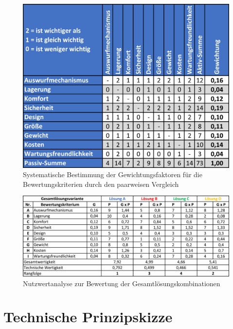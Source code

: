 \begin{figure}[H]
	\centering
	\includegraphics[width=0.7\linewidth]{chapter/Bilder/paarweiservgl}
	\caption{Systematische Bestimmung der Gewichtungsfaktoren für die Bewertungskriterien durch den paarweisen Vergleich}
	\label{fig:paarweiservgl}
\end{figure}

\begin{figure}[H]
	\centering
	\includegraphics[width=1.0\linewidth]{chapter/Bilder/nutzwertanalyse}
	\caption{Nutzwertanalyse zur Bewertung der Gesamtlösungskombinationen}
	\label{fig:nutzwertanalyse}
\end{figure}

\newpage
\section{Technische Prinzipskizze}

